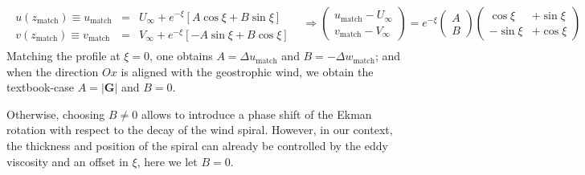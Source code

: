 \documentclass[smallcondensed,final]{svjour3}
\newcommand{\gzm}{{\xi}}%
\begin{document}
\begin{subequations}
\begin{eqnarray}
  \begin{matrix} 
    u(z_\text{match}) \equiv u_\text{match} &=& U_{\infty} + e^{-\gzm} \left [ A \cos\gzm + B\sin\gzm \right] \\
    v(z_\text{match}) \equiv v_\text{match} &=& V_{\infty} + e^{-\gzm} \left [-A \sin\gzm + B\cos\gzm \right]
  \end{matrix} 
\end{eqnarray}
\begin{eqnarray}
  \Rightarrow \left(\begin{matrix}
    u_\text{match}-U_{\infty} \\ 
    v_\text{match}-V_{\infty}
  \end{matrix}\right) = e^{-\gzm}\left(\begin{matrix}A \\ B \end{matrix}\right)\left(\begin{matrix}
    \cos\gzm &+ \sin\gzm \\ -\sin\gzm &+ \cos\gzm
  \end{matrix} \right) \\
\end{eqnarray}
\end{subequations}
Matching the profile at $\xi=0$, one obtains
$A = \Delta u_\text{match} $ and $B=-\Delta w_\text{match} $; and when the direction $Ox$ is aligned
with the geostrophic wind, we obtain the textbook-case $A=|\mathbf{G}|$ and $B=0$. 

Otherwise, choosing $B \ne 0$ allows to introduce a phase shift of the Ekman rotation with respect to
the decay of the wind spiral.
%
However, in our context, the thickness and position of the spiral can already be controlled by
the eddy viscosity and an offset in $\xi$, here we let $B=0$.
\end{document}

